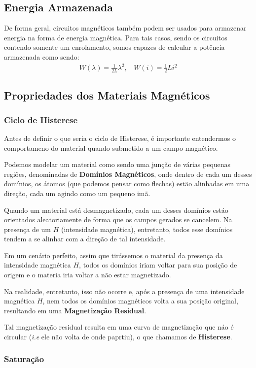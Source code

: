 \documentclass{article}
\begin{document}
\subsection{Energia Armazenada}
De forma geral, circuitos magnéticos também podem ser usados para armazenar energia na forma de energia magnética. Para tais casos, sendo os circuitos contendo somente um enrolamento, somos capazes de calcular a potência armazenada como sendo:
\begin{align}
W(\lambda) = \frac{1}{2L}\lambda^2, \ \ \ \ W(i) = \frac{1}{2}Li^2
\end{align}

\subsection{Propriedades dos Materiais Magnéticos}
\subsubsection{Ciclo de Histerese}
Antes de definir o que seria o ciclo de Histerese, é importante entendermos o comportameno do material quando submetido a um campo magnético. 

Podemos modelar um material como sendo uma junção de várias pequenas regiões, denominadas de \textbf{Domínios Magnéticos}, onde dentro de cada um desses domínios, os átomos (que podemos pensar como flechas) estão alinhadas em uma direção, cada um agindo como um pequeno imã.

Quando um material está desmagnetizado, cada um desses domínios estáo orientados aleatoriamente de forma que os campos gerados se cancelem. Na presença de um $H$ (intensidade magnética), entretanto, todos esse domínios tendem a se alinhar com a direção de tal intensidade.

Em um cenário perfeito, assim que tirássemos o material da presença da intensidade magnética $H$, todos os domínios iriam voltar para sua posição de origem e o materia iria voltar a não estar magnetizado. 

Na realidade, entretanto, isso não ocorre e, após a presença de uma intensidade magnética $H$, nem todos os domínios magnéticos volta a sua posição original, resultando em uma \textbf{Magnetização Residual}. 

Tal magnetização residual resulta em uma curva de magnetização que náo é circular (\emph{i.e} ele não volta de onde paprtiu), o que chamamos de \textbf{Histerese}.

\subsubsection{Saturação}
\end{document}
